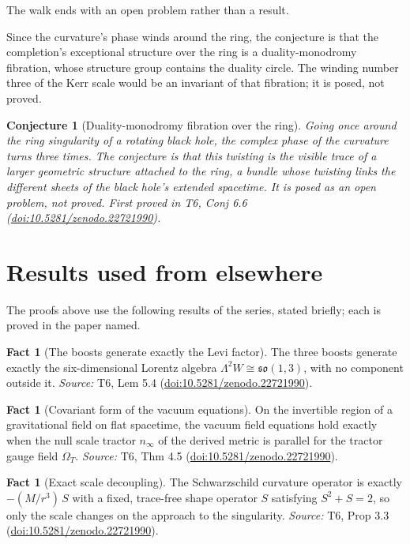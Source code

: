 \documentclass[11pt]{article}
\newtheorem{conjecture}[theorem]{Conjecture}
\theoremstyle{definition}
\newtheorem{fact}[theorem]{Fact}
\theoremstyle{plain}
\providecommand{\nInf}{}\renewcommand{\nInf}{n_\infty}
\begin{document}
The walk ends with an open problem rather than a result.

Since the curvature's phase winds around the ring, the conjecture is that the completion's exceptional structure over the ring is a duality-monodromy fibration, whose structure group contains the duality circle. The winding number three of the Kerr scale would be an invariant of that fibration; it is posed, not proved.

\begin{conjecture}[Duality-monodromy fibration over the ring]\label{c:interior.duality-monodromy-fibration-over-ring}
Going once around the ring singularity of a rotating black hole, the complex phase of the curvature turns three times. The conjecture is that this twisting is the visible trace of a larger geometric structure attached to the ring, a bundle whose twisting links the different sheets of the black hole's extended spacetime. It is posed as an open problem, not proved.
\emph{First proved in} T6, Conj 6.6 (\href{https://doi.org/10.5281/zenodo.22721990}{doi:10.5281/zenodo.22721990}).
\end{conjecture}

\section{Results used from elsewhere}
The proofs above use the following results of the series, stated briefly; each is proved in the paper named.

\begin{fact}[The boosts generate exactly the Levi factor]\label{c:interior.boosts-generate-exactly-levi-factor}
The three boosts generate exactly the six-dimensional Lorentz algebra $\Lambda^2 W \cong \mathfrak{so}(1,3)$, with no component outside it.
\emph{Source:} T6, Lem 5.4 (\href{https://doi.org/10.5281/zenodo.22721990}{doi:10.5281/zenodo.22721990}).
\end{fact}

\begin{fact}[Covariant form of the vacuum equations]\label{c:interior.covariant-form-vacuum-equations}
On the invertible region of a gravitational field on flat spacetime, the vacuum field equations hold exactly when the null scale tractor $\nInf$ of the derived metric is parallel for the tractor gauge field $\Omega_{T}$.
\emph{Source:} T6, Thm 4.5 (\href{https://doi.org/10.5281/zenodo.22721990}{doi:10.5281/zenodo.22721990}).
\end{fact}

\begin{fact}[Exact scale decoupling]\label{c:interior.exact-scale-decoupling}
The Schwarzschild curvature operator is exactly $-(M/r^3)\,S$ with a fixed, trace-free shape operator $S$ satisfying $S^2 + S = 2$, so only the scale changes on the approach to the singularity.
\emph{Source:} T6, Prop 3.3 (\href{https://doi.org/10.5281/zenodo.22721990}{doi:10.5281/zenodo.22721990}).
\end{fact}
\end{document}
